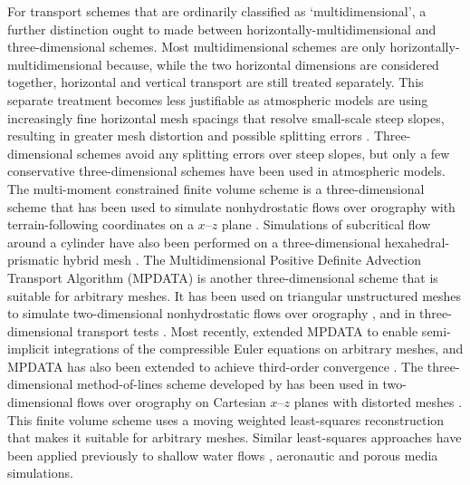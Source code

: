 For transport schemes that are ordinarily classified as `multidimensional', a further distinction ought to made between horizontally-multidimensional and three-dimensional schemes.
Most multidimensional schemes are only horizontally-multidimensional because, while the two horizontal dimensions are considered together, horizontal and vertical transport are still treated separately.
This separate treatment becomes less justifiable as atmospheric models are using increasingly fine horizontal mesh spacings that resolve small-scale steep slopes, resulting in greater mesh distortion and possible splitting errors \citep{kent2014}.
Three-dimensional schemes avoid any splitting errors over steep slopes, but only a few conservative three-dimensional schemes have been used in atmospheric models.
The multi-moment constrained finite volume scheme \citep{ii-xiao2009} is a three-dimensional scheme that has been used to simulate nonhydrostatic flows over orography with terrain-following coordinates on a $x$--$z$ plane \citep{li2013}.  Simulations of subcritical flow around a cylinder have also been performed on a three-dimensional hexahedral-prismatic hybrid mesh \citep{xie-xiao2016}.
The Multidimensional Positive Definite Advection Transport Algorithm (MPDATA) is another three-dimensional scheme that is suitable for arbitrary meshes.
It has been used on triangular unstructured meshes to simulate two-dimensional nonhydrostatic flows over orography \citep{smolarkiewicz-szmelter2011}, and in three-dimensional transport tests \citep{smolarkiewicz-szmelter2005}. 
Most recently, \citet{kuehnlein-smolarkiewicz2017} extended MPDATA to enable semi-implicit integrations of the compressible Euler equations on arbitrary meshes, and MPDATA has also been extended to achieve third-order convergence \citep{waruszewski2018}.
The three-dimensional method-of-lines scheme developed by \citet{weller-shahrokhi2014} has been used in two-dimensional flows over orography on Cartesian $x$--$z$ planes with distorted meshes \citep{chen2017}.
This finite volume scheme uses a moving weighted least-squares reconstruction \citep{lashley2002,thuburn2014} that makes it suitable for arbitrary meshes.
Similar least-squares approaches have been applied previously to shallow water flows \citep{cuetofelgueroso2006}, aeronautic \citep{cuetofelgueroso2007} and porous media \citep{white2017} simulations.

